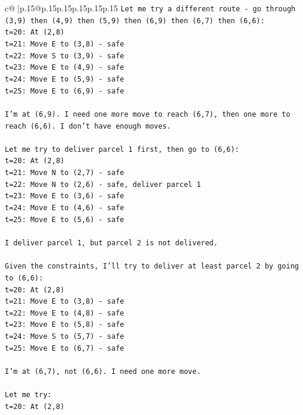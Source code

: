 \documentclass{article}
\begin{document}
{\begin{supertabular}{c@{$\;$}|p{.15\linewidth}@{}p{.15\linewidth}p{.15\linewidth}p{.15\linewidth}p{.15\linewidth}p{.15\linewidth}}
{{{\texttt{Let me try a different route {-} go through (3,9) then (4,9) then (5,9) then (6,9) then (6,7) then (6,6):} \\
\texttt{t=20: At (2,8)} \\
\texttt{t=21: Move E to (3,8) {-} safe} \\
\texttt{t=22: Move S to (3,9) {-} safe} \\
\texttt{t=23: Move E to (4,9) {-} safe} \\
\texttt{t=24: Move E to (5,9) {-} safe} \\
\texttt{t=25: Move E to (6,9) {-} safe} \\
\\ 
\texttt{I'm at (6,9). I need one more move to reach (6,7), then one more to reach (6,6). I don't have enough moves.} \\
\\ 
\texttt{Let me try to deliver parcel 1 first, then go to (6,6):} \\
\texttt{t=20: At (2,8)} \\
\texttt{t=21: Move N to (2,7) {-} safe} \\
\texttt{t=22: Move N to (2,6) {-} safe, deliver parcel 1} \\
\texttt{t=23: Move E to (3,6) {-} safe} \\
\texttt{t=24: Move E to (4,6) {-} safe} \\
\texttt{t=25: Move E to (5,6) {-} safe} \\
\\ 
\texttt{I deliver parcel 1, but parcel 2 is not delivered.} \\
\\ 
\texttt{Given the constraints, I'll try to deliver at least parcel 2 by going to (6,6):} \\
\texttt{t=20: At (2,8)} \\
\texttt{t=21: Move E to (3,8) {-} safe} \\
\texttt{t=22: Move E to (4,8) {-} safe} \\
\texttt{t=23: Move E to (5,8) {-} safe} \\
\texttt{t=24: Move S to (5,7) {-} safe} \\
\texttt{t=25: Move E to (6,7) {-} safe} \\
\\ 
\texttt{I'm at (6,7), not (6,6). I need one more move.} \\
\\ 
\texttt{Let me try:} \\
\texttt{t=20: At (2,8)} \\
}}}
\end{supertabular}}
\end{document}
